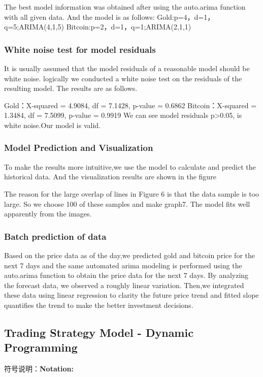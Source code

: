 \documentclass{mcmthesis}
\begin{document}
The best model information was obtained after using the auto.arima function with all given data.
And the model is as follows:
Gold:p=4，d=1，q=5;ARIMA(4,1,5)                          Bitcoin:p=2，d=1，q=1;ARIMA(2,1,1) 

\subsubsection{White noise test for model residuals}
It is usually assumed that the model residuals of a reasonable model should be white noise.
logically we conducted a white noise test on the residuals of the resulting model.
The results are as follows.

Gold：X-squared = 4.9084, df = 7.1428, p-value = 0.6862
Bitcoin：X-squared = 1.3484, df = 7.5099, p-value = 0.9919
We can see model residuals p>0.05, is white noise.Our model is valid.


\subsubsection{Model Prediction and Visualization}
To make the results more intuitive,we use the model to calculate and predict the historical data. 
And the visualization results are shown in the figure

The reason for the large overlap of lines in Figure 6 is that the data sample is too large.
So we choose 100 of these samples and make graph7.
The model fits well apparently from the images.


\subsubsection{Batch prediction of data}   %
Based on the price data as of the day,we predicted gold and bitcoin price for the next 7 days 
and the same automated arima modeling is performed using the auto.arima function to obtain the price data for the next 7 days.
By analyzing the forecast data, we observed a roughly linear variation. 
Then,we integrated these data using linear regression to clarity the future price trend 
and fitted slope quantifies the trend to make the better investment decisions.



\subsection{Trading Strategy Model - Dynamic Programming }
符号说明：\textbf{Notation:}
\end{document}
